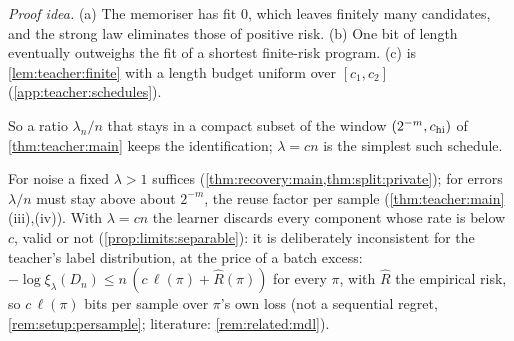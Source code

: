 \emph{Proof idea.} (a) The memoriser has fit $0$, which leaves finitely many candidates, and the strong law eliminates those of positive risk. (b) One bit of length eventually outweighs the fit of a shortest finite-risk program. (c) is \cref{lem:teacher:finite} with a length budget uniform over $[c_1,c_2]$ (\cref{app:teacher:schedules}).

So a ratio $\lambda_n/n$ that stays in a compact subset of the window $(2^{-m},c_{\rm hi})$ of \cref{thm:teacher:main} keeps the identification; $\lambda=cn$ is the simplest such schedule.

\begin{remark}\label{rem:limits:schedule}
For noise a fixed $\lambda>1$ suffices (\cref{thm:recovery:main,thm:split:private}); for errors $\lambda/n$ must stay above about $2^{-m}$, the reuse factor per sample (\cref{thm:teacher:main}(iii),(iv)). With $\lambda=cn$ the learner discards every component whose rate is below $c$, valid or not (\cref{prop:limits:separable}): it is deliberately inconsistent for the teacher's label distribution, at the price of a batch excess: $-\log\xi_\lambda(D_n)\le n\,(c\,\ell(\pi)+\hat R(\pi))$ for every $\pi$, with $\hat R$ the empirical risk, so $c\,\ell(\pi)$ bits per sample over $\pi$'s own loss (not a sequential regret, \cref{rem:setup:persample}; literature: \cref{rem:related:mdl}).
\end{remark}

